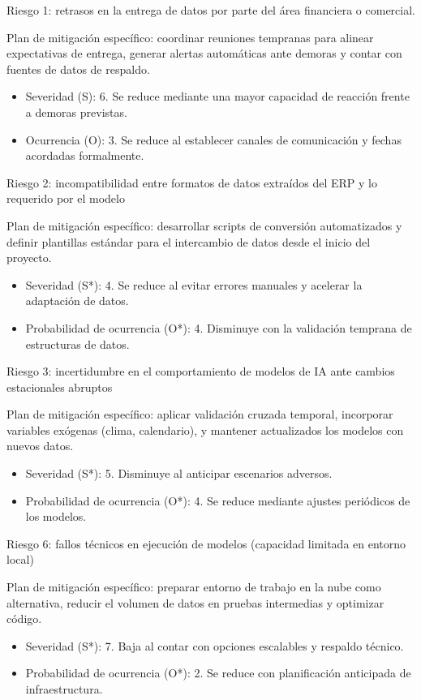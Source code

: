 \documentclass[
11pt, %
]{charter}
\begin{document}
Riesgo 1: retrasos en la entrega de datos por parte del área financiera o comercial.

Plan de mitigación específico: coordinar reuniones tempranas para alinear expectativas de entrega, generar alertas automáticas ante demoras y contar con fuentes de datos de respaldo.
\begin{itemize}
	\item Severidad (S):  6. Se reduce  mediante una mayor capacidad de reacción frente a demoras previstas.
	\item Ocurrencia (O): 3. Se reduce al establecer canales de comunicación y fechas acordadas formalmente.
\end{itemize}

Riesgo 2: incompatibilidad entre formatos de datos extraídos del ERP y lo requerido por el modelo

Plan de mitigación específico: desarrollar scripts de conversión automatizados y definir plantillas estándar para el intercambio de datos desde el inicio del proyecto.
\begin{itemize}
	\item Severidad (S*): 4. Se reduce al evitar errores manuales y acelerar la adaptación de datos.
	\item Probabilidad de ocurrencia (O*): 4. Disminuye con la validación temprana de estructuras de datos.
\end{itemize}

Riesgo 3: incertidumbre en el comportamiento de modelos de IA ante cambios estacionales abruptos

Plan de mitigación específico: aplicar validación cruzada temporal, incorporar variables exógenas (clima, calendario), y mantener actualizados los modelos con nuevos datos.
\begin{itemize}
	\item Severidad (S*): 5. Disminuye al anticipar escenarios adversos.
	\item Probabilidad de ocurrencia (O*): 4. Se reduce mediante ajustes periódicos de los modelos.
\end{itemize}

Riesgo 6: fallos técnicos en ejecución de modelos (capacidad limitada en entorno local)

Plan de mitigación específico: preparar entorno de trabajo en la nube como alternativa, reducir el volumen de datos en pruebas intermedias y optimizar código.
\begin{itemize}
	\item Severidad (S*): 7. Baja al contar con opciones escalables y respaldo técnico.
	\item Probabilidad de ocurrencia (O*): 2. Se reduce con planificación anticipada de infraestructura.
\end{itemize}
\end{document}
